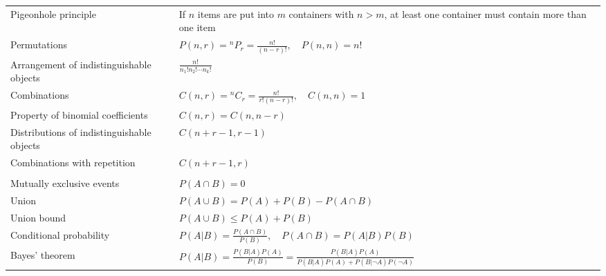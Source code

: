 \documentclass[a4paper,landscape]{article}
\begin{document}
\begin{multicols*}{2}
\begin{tabularx}{\columnwidth}{@{}lX@{}}
        Pigeonhole principle                       & If $n$ items are put into $m$ containers with $n > m$, at least one container must contain more than one item        \\
        Permutations                               & $P(n,r) = {}^nP_r = \frac{n!}{(n-r)!},\quad P(n,n) = n!$                                                             \\
        Arrangement of indistinguishable objects   & $\frac{n!}{n_1! n_2! \cdots n_k!}$                                                                                   \\
        Combinations                               & $C(n,r) = {}^nC_r = \frac{n!}{r!(n-r)!},\quad C(n,n) = 1$                                                            \\
        Property of binomial coefficients          & $C(n,r) = C(n,n-r)$                                                                                                  \\
        Distributions of indistinguishable objects & $C(n+r-1, r-1)$                                                                                                      \\
        Combinations with repetition               & $C(n+r-1, r)$                                                                                                        \\
        \\
        Mutually exclusive events                  & $P(A \cap B) = 0$                                                                                                    \\
        Union                                      & $P(A \cup B) = P(A) + P(B) - P(A \cap B)$                                                                            \\
        Union bound                                & $P(A \cup B) \leq P(A) + P(B)$                                                                                       \\
        Conditional probability                    & $P(A|B) = \frac{P(A \cap B)}{P(B)},\quad P(A \cap B) = P(A|B)P(B)$                                                   \\
        Bayes' theorem                             & $P(A|B) = \frac{P(B|A)P(A)}{P(B)} = \frac{P(B|A)P(A)}{P(B|A)P(A) + P(B|\neg A)P(\neg A)}$                            \\

\end{tabularx}
\end{multicols*}
\end{document}
